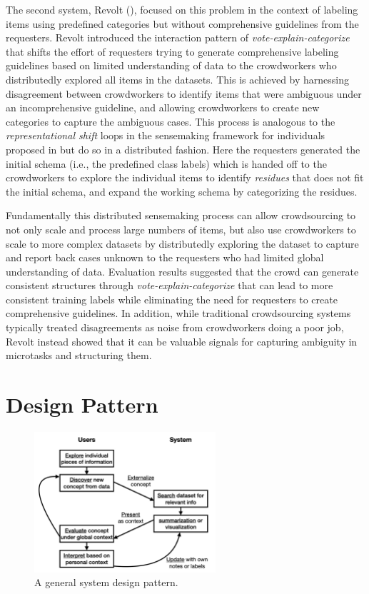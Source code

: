 The second system, Revolt (), focused on this problem in the context of labeling items using predefined categories but without comprehensive guidelines from the requesters. Revolt introduced the interaction pattern of \emph{vote-explain-categorize} that shifts the effort of requesters trying to generate comprehensive labeling guidelines based on limited understanding of data to the crowdworkers who distributedly explored all items in the datasets. This is achieved by harnessing disagreement between crowdworkers to identify items that were ambiguous under an incomprehensive guideline, and allowing crowdworkers to create new categories to capture the ambiguous cases. This process is analogous to the \emph{representational shift} loops in the sensemaking framework for individuals proposed in \cite{russell1993cost} but do so in a distributed fashion. Here the requesters generated the initial schema (i.e., the predefined class labels) which is handed off to the crowdworkers to explore the individual items to identify \emph{residues} that does not fit the initial schema, and expand the working schema by categorizing the residues.

Fundamentally this distributed sensemaking process can allow crowdsourcing to not only scale and process large numbers of items, but also use crowdworkers to scale to more complex datasets by distributedly exploring the dataset to capture and report back cases unknown to the requesters who had limited global understanding of data. Evaluation results suggested that the crowd can generate consistent structures through \emph{vote-explain-categorize} that can lead to more consistent training labels while eliminating the need for requesters to create comprehensive guidelines. In addition, while traditional crowdsourcing systems typically treated disagreements as noise from crowdworkers doing a poor job, Revolt instead showed that it can be valuable signals for capturing ambiguity in microtasks and structuring them.


\section{Design Pattern}

 \begin{figure}[H]
    \centering
    \includegraphics[width=0.6\textwidth]{images/framework.png}
    \caption[A general system design pattern.]{A general system design pattern.}
    \label{fig:framework}
\end{figure}


